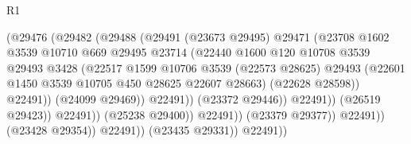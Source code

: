 \begin{lexlean}{R1}
\begin{coremodule}
                                      (@29476
                                        (@29482
                                          (@29488
                                            (@29491
                                              (@23673 @29495)
                                              @29471
                                              (@23708
                                                @1602
                                                @3539
                                                @10710
                                                @669
                                                @29495
                                                @23714
                                                (@22440
                                                  @1600
                                                  @120
                                                  @10708
                                                  @3539
                                                  @29493
                                                  @3428
                                                  (@22517
                                                    @1599
                                                    @10706
                                                    @3539
                                                    (@22573 @28625)
                                                    @29493
                                                    (@22601
                                                      @1450
                                                      @3539
                                                      @10705
                                                      @450
                                                      @28625
                                                      @22607
                                                      @28663)
                                                    (@22628 @28598))
                                                  @22491))
                                              (@24099 @29469))
                                            @22491))
                                        (@23372 @29446))
                                      @22491))
                                  (@26519 @29423))
                                @22491))
                            (@25238 @29400))
                          @22491))
                      (@23379 @29377))
                    @22491))
                (@23428 @29354))
              @22491))
          (@23435 @29331))
        @22491))

\end{coremodule}
\end{lexlean}
